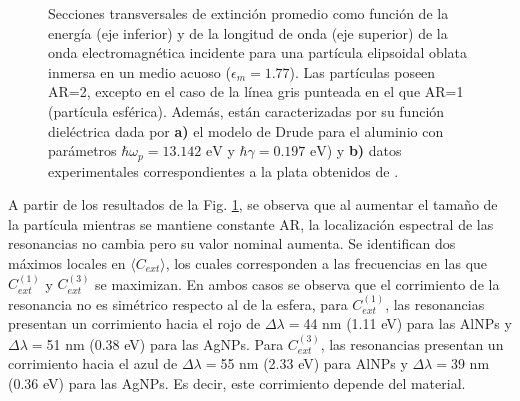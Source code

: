 \begin{figure}[h!]
	\quad%
	\caption{Secciones transversales de extinción promedio como función de la energía (eje inferior) y de la longitud de onda (eje superior) de la onda electromagnética incidente para una partícula elipsoidal oblata inmersa en un medio acuoso ($\epsilon_m=1.77$). Las partículas poseen AR=2, excepto en el caso de la línea gris punteada en el que AR=1 (partícula esférica). Además, están caracterizadas por su función dieléctrica dada por  \textbf{a)} el modelo de Drude para el aluminio con parámetros $\hbar\omega_p=13.142\text{ eV}$ y $\hbar\gamma=0.197\text{ eV}$) y \textbf{b)} datos experimentales correspondientes a la plata obtenidos de \cite{Plata}. }\label{aluminioplataAR}
\end{figure}
A partir de los resultados de la Fig. \ref{aluminioplataAR}, se observa que al aumentar el tamaño de la partícula mientras se mantiene constante AR, la localización espectral de las resonancias no cambia pero su valor nominal aumenta. Se identifican dos máximos locales en $\langle C_{ext}\rangle$,  los cuales corresponden a las frecuencias en las que $C_{ext}^{(1)}$ y $C_{ext}^{(3)}$ se maximizan. En ambos casos se observa que el corrimiento  de la resonancia no es simétrico respecto al de la esfera, para $C_{ext}^{(1)}$, las resonancias presentan un corrimiento hacia el rojo de $\Delta\lambda=$44 nm (1.11 eV) para las AlNPs y $\Delta\lambda=$51 nm (0.38 eV) para las AgNPs. Para $C_{ext}^{(3)}$, las resonancias presentan un corrimiento hacia el azul de $\Delta\lambda=$55 nm (2.33 eV) para AlNPs y $\Delta\lambda=$39 nm (0.36 eV) para las AgNPs. Es decir, este corrimiento depende del material.\\

